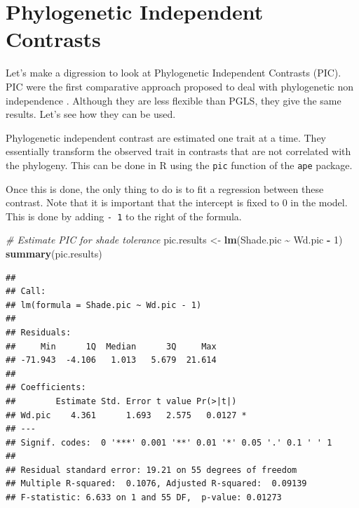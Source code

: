 \documentclass[
]{book}
\newenvironment{Shaded}{\begin{snugshade}}{\end{snugshade}}
\newcommand{\AttributeTok}[1]{\textcolor[rgb]{0.13,0.29,0.53}{#1}}
\newcommand{\CommentTok}[1]{\textcolor[rgb]{0.56,0.35,0.01}{\textit{#1}}}
\newcommand{\DecValTok}[1]{\textcolor[rgb]{0.00,0.00,0.81}{#1}}
\newcommand{\FunctionTok}[1]{\textcolor[rgb]{0.13,0.29,0.53}{\textbf{#1}}}
\newcommand{\NormalTok}[1]{#1}
\newcommand{\OtherTok}[1]{\textcolor[rgb]{0.56,0.35,0.01}{#1}}
\newcommand{\SpecialCharTok}[1]{\textcolor[rgb]{0.81,0.36,0.00}{\textbf{#1}}}
\begin{document}
\chapter{Phylogenetic Independent Contrasts}\label{pic}

Let's make a digression to look at Phylogenetic Independent Contrasts (PIC). PIC were the first comparative approach proposed to deal with phylogenetic non independence \citep{felsenstein1985phylogenies}. Although they are less flexible than PGLS, they give the same results. Let's see how they can be used.

Phylogenetic independent contrast are estimated one trait at a time. They essentially transform the observed trait in contrasts that are not correlated with the phylogeny. This can be done in R using the \texttt{pic} function of the \texttt{ape} package.

\begin{Shaded}
\end{Shaded}

Once this is done, the only thing to do is to fit a regression between these contrast. Note that it is important that the intercept is fixed to 0 in the model. This is done by adding \texttt{-\ 1} to the right of the formula.

\begin{Shaded}
\begin{Highlighting}[]
\CommentTok{\# Estimate PIC for shade tolerance}
\NormalTok{pic.results }\OtherTok{\textless{}{-}} \FunctionTok{lm}\NormalTok{(Shade.pic }\SpecialCharTok{\textasciitilde{}}\NormalTok{ Wd.pic }\SpecialCharTok{{-}} \DecValTok{1}\NormalTok{)}
\FunctionTok{summary}\NormalTok{(pic.results)}
\end{Highlighting}
\end{Shaded}

\begin{verbatim}
## 
## Call:
## lm(formula = Shade.pic ~ Wd.pic - 1)
## 
## Residuals:
##     Min      1Q  Median      3Q     Max 
## -71.943  -4.106   1.013   5.679  21.614 
## 
## Coefficients:
##        Estimate Std. Error t value Pr(>|t|)  
## Wd.pic    4.361      1.693   2.575   0.0127 *
## ---
## Signif. codes:  0 '***' 0.001 '**' 0.01 '*' 0.05 '.' 0.1 ' ' 1
## 
## Residual standard error: 19.21 on 55 degrees of freedom
## Multiple R-squared:  0.1076, Adjusted R-squared:  0.09139 
## F-statistic: 6.633 on 1 and 55 DF,  p-value: 0.01273
\end{verbatim}
\end{document}
